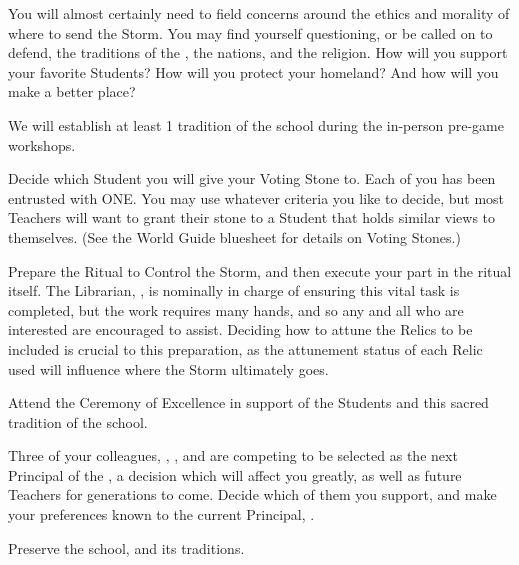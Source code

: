 \documentclass[blue]{GL2020}
\begin{document}
You will almost certainly need to field concerns around the ethics and morality of where to send the Storm. You may find yourself questioning, or be called on to defend, the traditions of the \pSc{}, the nations, and the religion. How will you support your favorite Students? How will you protect your homeland? And how will you make \pEarth{} a better place?

\begin{itemz}[Notes]
	\item We will establish at least 1 tradition of the school during the in-person pre-game workshops.
\end{itemz}

\begin{itemz}[Goals]
    \item Decide which Student you will give your Voting Stone to. Each of you has been entrusted with ONE. You may use whatever criteria you like to decide, but most Teachers will want to grant their stone to a Student that holds similar views to themselves. (See the World Guide bluesheet for details on Voting Stones.)
    \item Prepare the Ritual to Control the Storm, and then execute your part in the ritual itself. The Librarian, \cLibrarian{\full}, is nominally in charge of ensuring this vital task is completed, but the work requires many hands, and so any and all who are interested are encouraged to assist. Deciding how to attune the Relics to be included is crucial to this preparation, as the attunement status of each Relic used will influence where the Storm ultimately goes.
    \item Attend the Ceremony of Excellence in support of the Students and this sacred tradition of the school.
    \item Three of your colleagues, \cMusic{\full}, \cBeetle{\full}, and \cChupSecond{\full} are competing to be selected as the next Principal of the \pSc{}, a decision which will affect you greatly, as well as future Teachers for generations to come. Decide which of them you support, and make your preferences known to the current Principal, \cPrincipal{\full}.
    \item Preserve the school, and its traditions.
\end{itemz}
\end{document}
